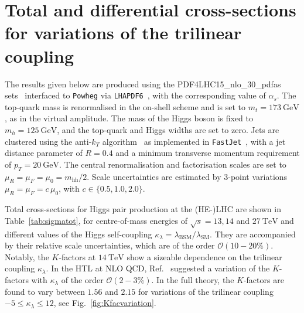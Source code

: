\documentclass[a4paper]{jpconf}
\newcommand{\GeV}{\ensuremath{\mathrm{\:GeV}}}
\newcommand{\TeV}{\ensuremath{\mathrm{\:TeV}}}
\newcommand{\chhh}{\ensuremath{\kappa_{\lambda}}}
\begin{document}



\section{Total and differential cross-sections for variations of the trilinear coupling}

The results given below are produced using the PDF4LHC15\_nlo\_30\_pdfas sets~\cite{Butterworth:2015oua,CT14,MMHT14,NNPDF} interfaced to \texttt{Powheg} via \texttt{LHAPDF6}~\cite{Buckley:2014ana}, with the corresponding value of $\alpha_s$. The top-quark mass is renormalised in the on-shell scheme and is set to $m_t=173 \GeV$, as in the virtual amplitude. The mass of the Higgs boson is fixed to $m_h=125 \GeV$, and the top-quark and Higgs widths are set to zero. Jets are clustered using the anti-$k_T$ algorithm~\cite{Cacciari:2008gp} as implemented in \texttt{FastJet}~\cite{Cacciari:2005hq, Cacciari:2011ma}, with a jet distance parameter of $R=0.4$ and a minimum transverse momentum requirement of $p_{T} = 20 \GeV$. The central renormalisation and factorisation scales are set to $\mu_R = \mu_F = \mu_0 = m_{\mathrm{hh}} / 2$. Scale uncertainties are estimated by 3-point variations $\mu_R = \mu_F = c\, \mu_0$, with $c \in \lbrace {0.5, 1.0, 2.0} \rbrace$.

Total cross-sections for Higgs pair production at the (HE-)LHC are shown in Table~\ref{tab:sigmatot}, for centre-of-mass energies of $\sqrt{s}=13,14$ and $27 \TeV$ and different values of the Higgs self-coupling $\chhh = \lambda_{\mathrm{BSM}} / \lambda_{\mathrm{SM}}$. They are accompanied by their relative scale uncertainties, which are of the order $\mathcal{O}(10-20\%)$. Notably, the $K$-factors at $14 \TeV$ show a sizeable dependence on the trilinear coupling $\chhh$. In the HTL at NLO QCD, Ref.~\cite{Grober:2015cwa} suggested a variation of the $K$-factors with $\chhh$ of the order $\mathcal{O}(2-3\%)$. In the full theory, the $K$-factors are found to vary between $1.56$ and $2.15$ for variations of the trilinear coupling $-5 \leq \chhh \leq 12$, see Fig.~\ref{fig:Kfacvariation}. 
\end{document}
